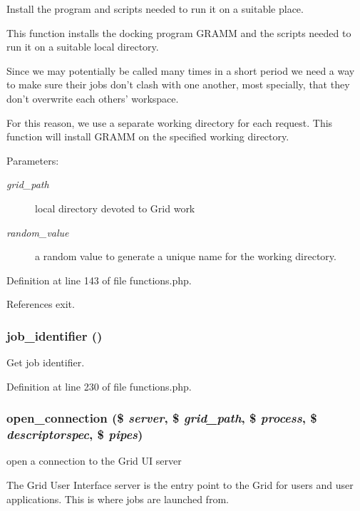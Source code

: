Install the program and scripts needed to run it on a suitable place. 

This function installs the docking program GRAMM and the scripts needed to run it on a suitable local directory.

Since we may potentially be called many times in a short period we need a way to make sure their jobs don't clash with one another, most specially, that they don't overwrite each others' workspace.

For this reason, we use a separate working directory for each request. This function will install GRAMM on the specified working directory.

\begin{Desc}
\item[Parameters:]
\begin{description}
\item[{\em grid\_\-path}]local directory devoted to Grid work \item[{\em random\_\-value}]a random value to generate a unique name for the working directory. \end{description}
\end{Desc}


Definition at line 143 of file functions.php.

References exit.
\subsubsection{\setlength{\rightskip}{0pt plus 5cm}job\_\-identifier ()}\label{functions_8php_a5}


Get job identifier. 



Definition at line 230 of file functions.php.
\subsubsection{\setlength{\rightskip}{0pt plus 5cm}open\_\-connection (\$ {\em server}, \$ {\em grid\_\-path}, \$ {\em process}, \$ {\em descriptorspec}, \$ {\em pipes})}\label{functions_8php_a0}


open a connection to the Grid UI server 

The Grid User Interface server is the entry point to the Grid for users and user applications. This is where jobs are launched from.

